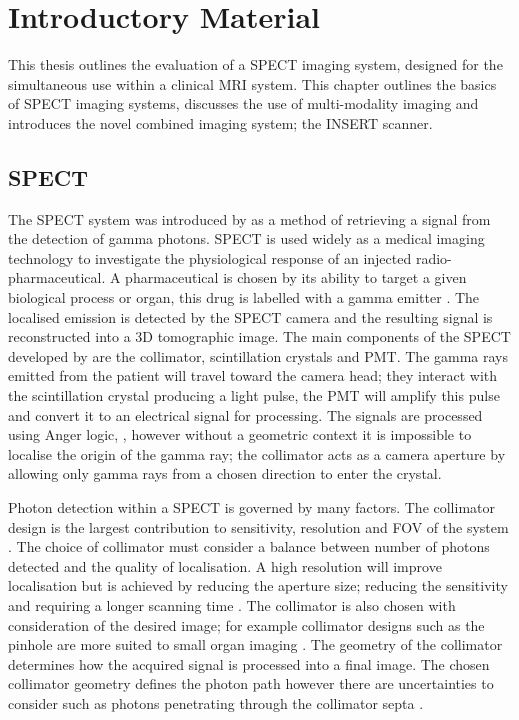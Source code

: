 \chapter{Introductory Material}
\label{Introduction}

This thesis outlines the evaluation of a \acrshort{SPECT} imaging system, designed for the simultaneous use within a clinical \acrshort{MRI} system. This chapter outlines the basics of \acrshort{SPECT} imaging systems, discusses the use of multi-modality imaging and introduces the novel combined imaging system; the \acrshort{INSERT} scanner. 

\section{SPECT}
The \acrlong{SPECT} system was introduced by \cite{Anger1958ScintillationCamera} as a method of retrieving a signal from the detection of gamma photons. \acrshort{SPECT} is used widely as a medical imaging technology to investigate the physiological response of an injected radio-pharmaceutical. A pharmaceutical is chosen by its ability to target a given biological process or organ, this drug is labelled with a gamma emitter \cite{Chiewitz1935Radioactive1}. The localised emission is detected by the \acrshort{SPECT} camera and the resulting signal is reconstructed into a 3D tomographic image. The main components of the \acrshort{SPECT} developed by \cite{Anger1952UseStudies} are the collimator, scintillation crystals and \acrlong{PMT}. The gamma rays emitted from the patient will travel toward the camera head; they interact with the scintillation crystal producing a light pulse, the \acrshort{PMT} will amplify this pulse and convert it to an electrical signal for processing. The signals are processed using Anger logic, \cite{Peterson2011SPECTBeyond.}, however without a geometric context it is impossible to localise the origin of the gamma ray; the collimator acts as a camera aperture by allowing only gamma rays from a chosen direction to enter the crystal.

Photon detection within a \acrshort{SPECT} is governed by many factors. The collimator design is the largest contribution to sensitivity, resolution and \acrlong{FOV} of the system \cite{0031-9155-50-21-004}. The choice of collimator must consider a balance between number of photons detected and the quality of localisation. A high resolution will improve localisation but is achieved by reducing the aperture size; reducing the sensitivity and requiring a longer scanning time \cite{doi:10.1001/jama.1965.03080190014004}. The collimator is also chosen with consideration of the desired image; for example collimator designs such as the pinhole are more suited to small organ imaging \cite{1076033}. The geometry of the collimator determines how the acquired signal is processed into a final image. The chosen collimator geometry defines the photon path however there are uncertainties to consider such as photons penetrating through the collimator septa \cite{Accorsi2008DerivationCollimation} \cite{0031-9155-18-6-005}. 

